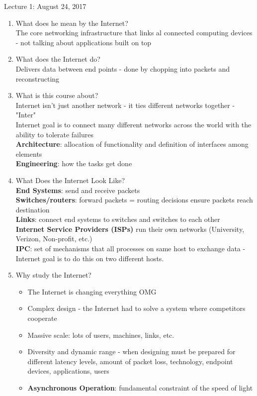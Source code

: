 \documentclass{article}
\begin{document}
Lecture 1: August 24, 2017
\begin{enumerate}
\item What does he mean by the Internet? \\
The core networking infrastructure that links al connected computing devices - not talking about applications built on top
\item What does the Internet do? \\
Delivers data between end points - done by chopping into packets and reconstructing
\item What is this course about? \\
Internet isn't just another network - it ties different networks together - "Inter" \\
Internet goal is to connect many different networks across the world with the ability to tolerate failures \\ 
\textbf{Architecture}: allocation of functionality and definition of interfaces among elements \\
\textbf{Engineering}: how the tasks get done
\item What Does the Internet Look Like? \\
\textbf{End Systems}: send and receive packets \\
\textbf{Switches/routers}: forward packets = routing decisions ensure packets reach destination \\
\textbf{Links}: connect end systems to switches and switches to each other \\
\textbf{Internet Service Providers (ISPs)} run their own networks (University, Verizon, Non-profit, etc.) \\
\textbf{IPC}: set of mechanisms that all processes on same host to exchange data - Internet goal is to do this on two different hosts.
\item Why study the Internet?
\begin{itemize}
\item The Internet is changing everything OMG
\item Complex design - the Internet had to solve a system where competitors cooperate
\item Massive scale: lots of users, machines, links, etc.
\item Diversity and dynamic range - when designing must be prepared for different latency levels, amount of packet loss, technology, endpoint devices, applications, users
\item \textbf{Asynchronous Operation}: fundamental constraint of the speed of light

\end{itemize}
\end{enumerate}
\end{document}
